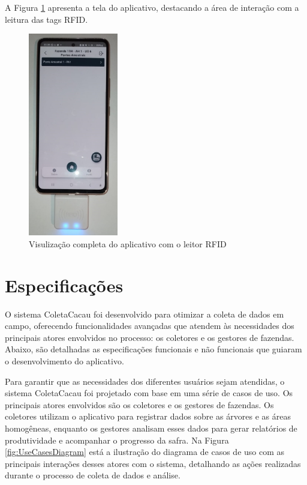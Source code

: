A Figura \ref{fig:LayoutRfid} apresenta a tela do aplicativo, destacando a área de interação com a leitura das tags RFID.

\begin{figure}[H]
    \centering
    \includegraphics[width=0.35\textwidth]{images/rfid/phone.jpeg}
    \caption{Visulização completa do aplicativo com o leitor RFID}
    \label{fig:LayoutRfid}
\end{figure}

\section{Especificações}
O sistema ColetaCacau foi desenvolvido para otimizar a coleta de dados em campo, oferecendo funcionalidades avançadas que atendem às necessidades dos principais atores envolvidos no processo: os coletores e os gestores de fazendas. Abaixo, são detalhadas as especificações funcionais e não funcionais que guiaram o desenvolvimento do aplicativo.

Para garantir que as necessidades dos diferentes usuários sejam atendidas, o sistema ColetaCacau foi projetado com base em uma série de casos de uso. Os principais atores envolvidos são os coletores e os gestores de fazendas. Os coletores utilizam o aplicativo para registrar dados sobre as árvores e as áreas homogêneas, enquanto os gestores analisam esses dados para gerar relatórios de produtividade e acompanhar o progresso da safra. Na Figura \ref{fig:UseCasesDiagram} está a ilustração do diagrama de casos de uso com as principais interações desses atores com o sistema, detalhando as ações realizadas durante o processo de coleta de dados e análise.

